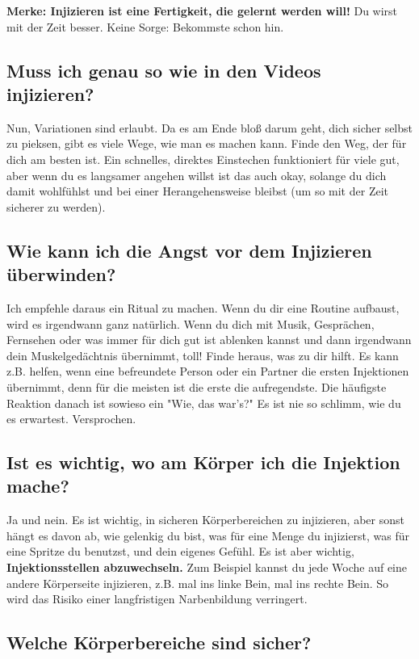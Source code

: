 \documentclass{article}
\begin{document}
\textbf{Merke: Injizieren ist eine Fertigkeit, die gelernt werden will!} Du wirst mit der Zeit besser. Keine Sorge: Bekommste schon hin.

\subsection{Muss ich genau so wie in den Videos injizieren?}

Nun, Variationen sind erlaubt. Da es am Ende bloß darum geht, dich sicher selbst zu pieksen, gibt es viele Wege, wie man es machen kann. Finde den Weg, der für dich am besten ist. Ein schnelles, direktes Einstechen funktioniert für viele gut, aber wenn du es langsamer angehen willst ist das auch okay, solange du dich damit wohlfühlst und bei einer Herangehensweise bleibst (um so mit der Zeit sicherer zu werden).

\subsection{Wie kann ich die Angst vor dem Injizieren überwinden?}

Ich empfehle daraus ein Ritual zu machen. Wenn du dir eine Routine aufbaust, wird es irgendwann ganz natürlich. Wenn du dich mit Musik, Gesprächen, Fernsehen oder was immer für dich gut ist ablenken kannst und dann irgendwann dein Muskelgedächtnis übernimmt, toll! Finde heraus, was zu dir hilft. Es kann z.B. helfen, wenn eine befreundete Person oder ein Partner die ersten Injektionen übernimmt, denn für die meisten ist die erste die aufregendste. Die häufigste Reaktion danach ist sowieso ein "Wie, das war's?" Es ist nie so schlimm, wie du es erwartest. Versprochen.

\subsection{Ist es wichtig, wo am Körper ich die Injektion mache?}

Ja und nein. Es ist wichtig, in sicheren Körperbereichen zu injizieren, aber sonst hängt es davon ab, wie gelenkig du bist, was für eine Menge du injizierst, was für eine Spritze du benutzst, und dein eigenes Gefühl. Es ist aber wichtig, \textbf{Injektionsstellen abzuwechseln.} Zum Beispiel kannst du jede Woche auf eine andere Körperseite injizieren, z.B. mal ins linke Bein, mal ins rechte Bein. So wird das Risiko einer langfristigen Narbenbildung verringert.

\subsection{Welche Körperbereiche sind sicher?}
\end{document}
